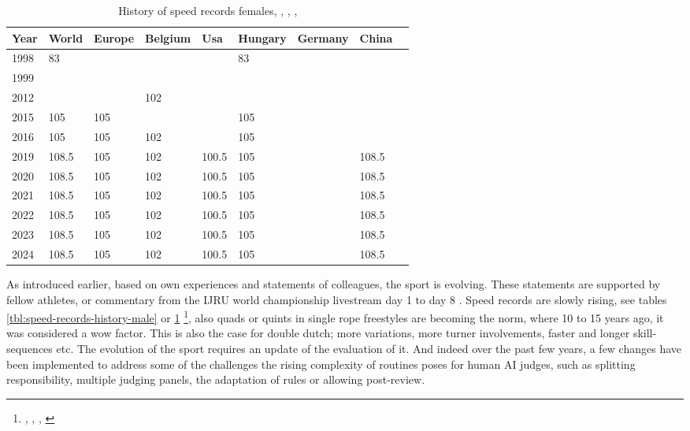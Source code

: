 \begin{table}[]
    \begin{tabular}{lllllllll}
        Year & World & Europe & Belgium & Usa   & Hungary & Germany & China \\ \hline
        1998 & 83    &        &         &       & 83      &         &       \\
        1999 &       &        &         &       &         &         &       \\
        2012 &       &        & 102     &       &         &         &       \\
        2015 & 105   & 105    &         &       & 105     &         &       \\
        2016 & 105   & 105    & 102     &       & 105     &         &       \\
        2019 & 108.5 & 105    & 102     & 100.5 & 105     &         & 108.5 \\
        2020 & 108.5 & 105    & 102     & 100.5 & 105     &         & 108.5 \\
        2021 & 108.5 & 105    & 102     & 100.5 & 105     &         & 108.5 \\
        2022 & 108.5 & 105    & 102     & 100.5 & 105     &         & 108.5 \\
        2023 & 108.5 & 105    & 102     & 100.5 & 105     &         & 108.5 \\
        2024 & 108.5 & 105    & 102     & 100.5 & 105     &         & 108.5
    \end{tabular}
    \caption[speed records females]{History of speed records females, \autocite{www_speed_30s_1999_WORLD}, \autocite{www_speed_30s_2024_BE}, \autocite{www_speed_30s_2024_IJRU_WORLD}, \autocite{www_speed_30s_2024_USA_AMJRF}}
    \label{tbl:speed-records-history-female}
\end{table}

As introduced earlier, based on own experiences and statements of colleagues, the sport is evolving. These statements are supported by fellow athletes, or commentary from the IJRU world championship livestream day 1 \autocite{IJRU_yt_2023_livestream_day1} to day 8 \autocite{IJRU_yt_2023_livestream_day8}.
Speed records are slowly rising, see tables \ref{tbl:speed-records-history-male} or \ref{tbl:speed-records-history-female} \footnote{\autocite{www_speed_30s_1999_WORLD}, \autocite{www_speed_30s_2024_BE}, \autocite{www_speed_30s_2024_IJRU_WORLD}, \autocite{www_speed_30s_2024_USA_AMJRF}}, also quads or quints in single rope freestyles are becoming the norm, where 10 to 15 years ago, it was considered a wow factor. This is also the case for double dutch; more variations, more turner involvements, faster and longer skill-sequences etc.
The evolution of the sport requires an update of the evaluation of it. And indeed over the past few years, a few changes have been implemented to address some of the challenges the rising complexity of routines poses for human AI judges, such as splitting responsibility, multiple judging panels, the adaptation of rules or allowing post-review.

